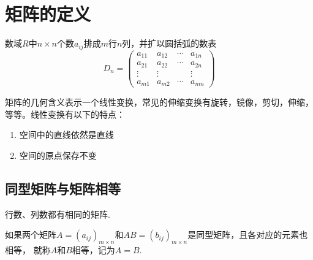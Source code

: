\documentclass[lang=cn,10pt]{elegantbook}
\begin{document}
\section{矩阵的定义}
\begin{definition}[矩阵] \label{def:jz} 
数域$R$中$n\times n$个数$a_{ij}$排成$m$行$n$列，并扩以圆括弧的数表
\begin{equation}
   \label{jz}
   D_n = \begin{pmatrix}
       a_{11}&a_{12}& \cdots & a_{1n}\\
       a_{21}&a_{22}& \cdots & a_{2n}\\
       \vdots&\vdots&         &\vdots\\
       a_{m1}&a_{m2}& \cdots & a_{mn}
   \end{pmatrix}
\end{equation}
\end{definition}
\begin{property}\label{property:jz}
矩阵的几何含义表示一个线性变换，常见的伸缩变换有旋转，镜像，剪切，伸缩，等等。线性变换有以下的特点：
\begin{enumerate}
    \item 空间中的直线依然是直线
    \item 空间的原点保存不变
\end{enumerate}
\end{property}

\subsection{同型矩阵与矩阵相等}
\begin{definition}[同型矩阵] \label{def:txjz} 
行数、列数都有相同的矩阵.
\end{definition}

\begin{definition}[同型矩阵] \label{def:jzxd} 
如果两个矩阵$A=(a_{ij})_{m\times n}$和$AB=(b_{ij})_{m\times n}$是同型矩阵，且各对应的元素也相等，
就称$A$和$B$相等，记为$A=B$.
\end{definition}
\end{document}
